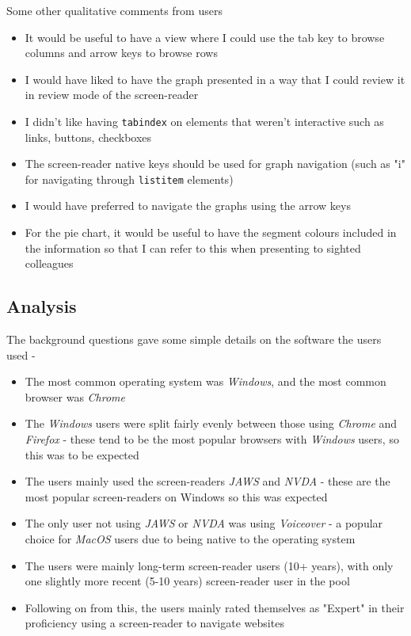 \documentclass[ %
                    author={Aleena Baig},
                supervisor={Dr Simon Lock},
                    degree={BSc},
                     title={On Making Web Accessible Graphs},
                  subtitle={},
                      year={2019} ]{dissertation}
\begin{document}
Some other qualitative comments from users

\begin{itemize}
    \item It would be useful to have a view where I could use the tab key to browse columns and arrow keys to browse rows
    \item I would have liked to have the graph presented in a way that I could review it in review mode of the screen-reader
    \item I didn't like having \texttt{tabindex} on elements that weren't interactive such as links, buttons, checkboxes
    \item The screen-reader native keys should be used for graph navigation (such as "i" for navigating through \texttt{listitem} elements)
    \item I would have preferred to navigate the graphs using the arrow keys
    \item For the pie chart, it would be useful to have the segment colours included in the information so that I can refer to this when presenting to sighted colleagues
\end{itemize}

\subsection{Analysis}

The background questions gave some simple details on the software the users used -

\begin{itemize}
    \item The most common operating system was \textit{Windows}, and the most common browser was \textit{Chrome}
    \item The \textit{Windows} users were split fairly evenly between those using \textit{Chrome} and \textit{Firefox} - these tend to be the most popular browsers with \textit{Windows} users, so this was to be expected
    \item The users mainly used the screen-readers \textit{JAWS} and \textit{NVDA} - these are the most popular screen-readers on Windows so this was expected
    \item The only user not using \textit{JAWS} or \textit{NVDA} was using \textit{Voiceover} - a popular choice for \textit{MacOS} users due to being native to the operating system
    \item The users were mainly long-term screen-reader users (10+ years), with only one slightly more recent (5-10 years) screen-reader user in the pool
    \item Following on from this, the users mainly rated themselves as "Expert" in their proficiency using a screen-reader to navigate websites
\end{itemize}
\end{document}
